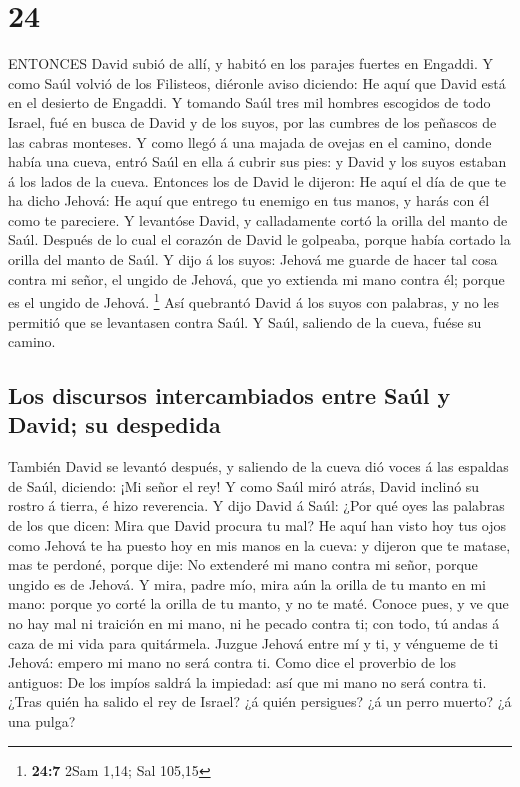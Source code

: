 \hypertarget{section-23}{%
\section{24}\label{section-23}}

 ENTONCES David subió de allí, y habitó en los parajes
fuertes en Engaddi.  Y como Saúl volvió de los Filisteos,
diéronle aviso diciendo: He aquí que David está en el desierto de
Engaddi.  Y tomando Saúl tres mil hombres escogidos de todo
Israel, fué en busca de David y de los suyos, por las cumbres de los
peñascos de las cabras monteses.  Y como llegó á una majada
de ovejas en el camino, donde había una cueva, entró Saúl en ella á
cubrir sus pies: y David y los suyos estaban á los lados de la cueva.
 Entonces los de David le dijeron: He aquí el día de que te
ha dicho Jehová: He aquí que entrego tu enemigo en tus manos, y harás
con él como te pareciere. Y levantóse David, y calladamente cortó la
orilla del manto de Saúl.  Después de lo cual el corazón de
David le golpeaba, porque había cortado la orilla del manto de Saúl.
 Y dijo á los suyos: Jehová me guarde de hacer tal cosa
contra mi señor, el ungido de Jehová, que yo extienda mi mano contra él;
porque es el ungido de Jehová. \footnote{\textbf{24:7} 2Sam 1,14; Sal
  105,15}  Así quebrantó David á los suyos con palabras, y
no les permitió que se levantasen contra Saúl. Y Saúl, saliendo de la
cueva, fuése su camino.

\hypertarget{los-discursos-intercambiados-entre-sauxfal-y-david-su-despedida}{%
\subsection{Los discursos intercambiados entre Saúl y David; su
despedida}\label{los-discursos-intercambiados-entre-sauxfal-y-david-su-despedida}}

 También David se levantó después, y saliendo de la cueva
dió voces á las espaldas de Saúl, diciendo: ¡Mi señor el rey! Y como
Saúl miró atrás, David inclinó su rostro á tierra, é hizo reverencia.
 Y dijo David á Saúl: ¿Por qué oyes las palabras de los que
dicen: Mira que David procura tu mal?  He aquí han visto
hoy tus ojos como Jehová te ha puesto hoy en mis manos en la cueva: y
dijeron que te matase, mas te perdoné, porque dije: No extenderé mi mano
contra mi señor, porque ungido es de Jehová.  Y mira, padre
mío, mira aún la orilla de tu manto en mi mano: porque yo corté la
orilla de tu manto, y no te maté. Conoce pues, y ve que no hay mal ni
traición en mi mano, ni he pecado contra ti; con todo, tú andas á caza
de mi vida para quitármela.  Juzgue Jehová entre mí y ti, y
véngueme de ti Jehová: empero mi mano no será contra ti. 
Como dice el proverbio de los antiguos: De los impíos saldrá la
impiedad: así que mi mano no será contra ti.  ¿Tras quién
ha salido el rey de Israel? ¿á quién persigues? ¿á un perro muerto? ¿á
una pulga?

